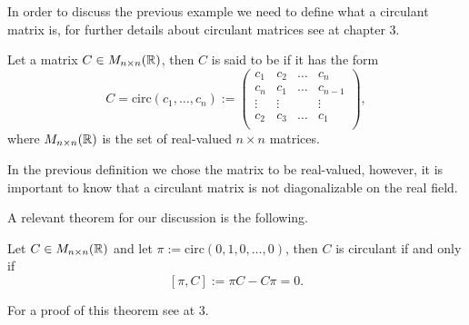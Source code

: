 \documentclass[../3.tex]{subfiles}
\begin{document}
    In order to discuss the previous example we need to define what a circulant matrix is, for further details about circulant matrices see \cite{circulant} at chapter 3.
    
    \begin{defn}
        Let a matrix $C \in M_{n \times n}(\mathbb{R})$, then $C$ is said to be  if it has the form 
        \[ C = \text{circ}(c_1, \dots, c_n) := 
        \begin{pmatrix}
            c_1 & c_2 & \dots & c_n \\
            c_n & c_1 & \dots & c_{n-1}\\
            \vdots & \vdots &  & \vdots \\
            c_2 & c_3 & \dots & c_1 \\
        \end{pmatrix}, \] 
        where $M_{n \times n}(\mathbb{R})$ is the set of real-valued $n \times n$ matrices.
    \end{defn}

    \begin{rem}
        In the previous definition we chose the matrix to be real-valued, however, it is important to know that a circulant matrix is not
        diagonalizable on the real field.
    \end{rem}

    A relevant theorem for our discussion is the following.

    \begin{thm}
        Let $C \in M_{n \times n}(\mathbb{R})$ and let $\pi := \text{circ}(0,1,0,\dots,0)$, then $C$ is circulant if and only if
        \[ [\pi, C] := \pi C - C \pi = 0 . \]
        \label{thm:circ}
    \end{thm}
    
    For a proof of this theorem see \cite{circulant} at 3.
\end{document}
